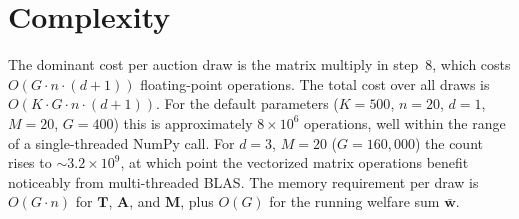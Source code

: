 \documentclass[11pt]{article}
\begin{document}
\section{Complexity}

The dominant cost per auction draw is the matrix multiply in step~8,
which costs $O(G \cdot n \cdot (d+1))$ floating-point operations.
The total cost over all draws is $O(K \cdot G \cdot n \cdot (d+1))$.
For the default parameters ($K = 500$, $n = 20$, $d = 1$, $M = 20$,
$G = 400$) this is approximately $8 \times 10^6$ operations,
well within the range of a single-threaded NumPy call.
For $d = 3$, $M = 20$ ($G = 160{,}000$) the count rises to
$\sim\!3.2 \times 10^9$, at which point the vectorized matrix
operations benefit noticeably from multi-threaded BLAS.
The memory requirement per draw is $O(G \cdot n)$ for
$\mathbf{T}$, $\mathbf{A}$, and $\mathbf{M}$, plus $O(G)$
for the running welfare sum $\bar{\mathbf{w}}$.
\end{document}
